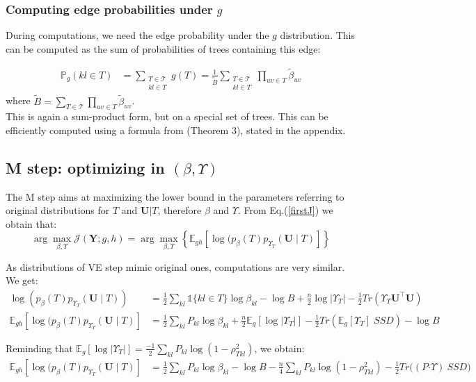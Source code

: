 \documentclass[11pt,a4paper]{article}
\newcommand{\argmax}{\arg\!\max}
\newcommand{\Ybf}{\boldsymbol{Y}}
\newcommand{\Ubf}{\boldsymbol{U}}
\newcommand{\Esp}{\mathds{E}}
\newcommand{\had}{\boldsymbol{\cdot}}
\begin{document}
\subsubsection{Computing edge probabilities under $g$}
During computations, we need the edge probability under the $g$ distribution. This can be computed as the sum of probabilities of trees containing this edge:

\begin{align*}
\mathds{P}_g(kl \in T)  &= \sum_{\substack{T  \in \mathcal{T} \\ kl \in T }} g(T) =\frac{1}{\widetilde{B}} \sum_{\substack{T  \in \mathcal{T} \\ kl \in T }} \prod_{uv \in T} \widetilde{\beta}_{uv}
\end{align*}
where $\displaystyle \widetilde{B}= \sum_{T \in \mathcal{T} }\prod_{uv \in T}  \widetilde{\beta}_{uv}$.\\

 This is again a sum-product form, but on a special set of trees. This can be efficiently computed using a formula from \citet{kirshner} (Theorem 3), stated in the appendix.
 
 
 \subsection{M step: optimizing in $(\beta, \Upsilon)$}
 The M step aims at maximizing the lower bound in the parameters referring to original distributions for $T$ and $\Ubf|T$, therefore $\beta$ and $\Upsilon$. From Eq.(\ref{firstJ}) we obtain that: 
$$ \argmax_{\beta, \Upsilon} \mathcal{J}(\Ybf ; g,h) =\argmax_{\beta, \Upsilon} \left\{ \Esp_{gh} [\log (p_\beta(T)p_{\Upsilon_T}(\Ubf\mid T) ]\right\} $$

As distributions of VE step mimic original ones, computations are very similar. We get:
\begin{align*}
\log (p_\beta(T)p_{\Upsilon_T}(\Ubf\mid T))  &= \frac{1}{2}\sum_{kl} \mathds{1}\{kl \in T\} \log \beta_{kl} - \log B + \frac{n}{2}\log |\Upsilon_T| - \frac{1}{2}Tr(\Upsilon_T \Ubf^\intercal \Ubf)\\
\Esp_{gh} [\log (p_\beta(T)p_{\Upsilon_T}(\Ubf\mid T) ] &= \frac{1}{2}\sum_{kl} P_{kl} \log\beta_{kl} +\frac{n}{2} \Esp_g[\log |\Upsilon_T|] -\frac{1}{2} Tr(\Esp_g [\Upsilon_T] \; SSD)- \log B
\end{align*}

Reminding that $\Esp_g[\log |\Upsilon_{T}|]= \frac{-1}{2}\sum _{kl} P_{kl}  \log \left(1-\rho_{Tkl}^2\right)$,  we obtain:
\begin{align*}
\Esp_{gh} [\log (p_\beta(T)p_{\Upsilon_T}(\Ubf\mid T) ] &=\frac{1}{2}\sum_{kl} P_{kl} \log  \beta_{kl} - \log B - \frac{n}{4} \sum_{kl} P_{kl} \log\left(1-\rho_{Tkl}^2\right)  - \frac{1}{2}Tr\big( (P \had \Upsilon)\: SSD\big) 
\end{align*}
 
\end{document}
